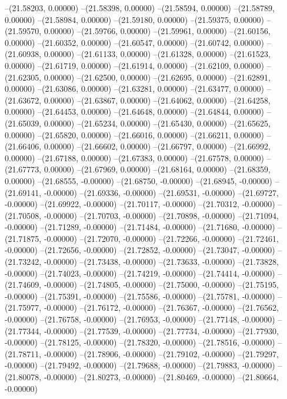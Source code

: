 --(21.58203, 0.00000)
--(21.58398, 0.00000)
--(21.58594, 0.00000)
--(21.58789, 0.00000)
--(21.58984, 0.00000)
--(21.59180, 0.00000)
--(21.59375, 0.00000)
--(21.59570, 0.00000)
--(21.59766, 0.00000)
--(21.59961, 0.00000)
--(21.60156, 0.00000)
--(21.60352, 0.00000)
--(21.60547, 0.00000)
--(21.60742, 0.00000)
--(21.60938, 0.00000)
--(21.61133, 0.00000)
--(21.61328, 0.00000)
--(21.61523, 0.00000)
--(21.61719, 0.00000)
--(21.61914, 0.00000)
--(21.62109, 0.00000)
--(21.62305, 0.00000)
--(21.62500, 0.00000)
--(21.62695, 0.00000)
--(21.62891, 0.00000)
--(21.63086, 0.00000)
--(21.63281, 0.00000)
--(21.63477, 0.00000)
--(21.63672, 0.00000)
--(21.63867, 0.00000)
--(21.64062, 0.00000)
--(21.64258, 0.00000)
--(21.64453, 0.00000)
--(21.64648, 0.00000)
--(21.64844, 0.00000)
--(21.65039, 0.00000)
--(21.65234, 0.00000)
--(21.65430, 0.00000)
--(21.65625, 0.00000)
--(21.65820, 0.00000)
--(21.66016, 0.00000)
--(21.66211, 0.00000)
--(21.66406, 0.00000)
--(21.66602, 0.00000)
--(21.66797, 0.00000)
--(21.66992, 0.00000)
--(21.67188, 0.00000)
--(21.67383, 0.00000)
--(21.67578, 0.00000)
--(21.67773, 0.00000)
--(21.67969, 0.00000)
--(21.68164, 0.00000)
--(21.68359, 0.00000)
--(21.68555, -0.00000)
--(21.68750, -0.00000)
--(21.68945, -0.00000)
--(21.69141, -0.00000)
--(21.69336, -0.00000)
--(21.69531, -0.00000)
--(21.69727, -0.00000)
--(21.69922, -0.00000)
--(21.70117, -0.00000)
--(21.70312, -0.00000)
--(21.70508, -0.00000)
--(21.70703, -0.00000)
--(21.70898, -0.00000)
--(21.71094, -0.00000)
--(21.71289, -0.00000)
--(21.71484, -0.00000)
--(21.71680, -0.00000)
--(21.71875, -0.00000)
--(21.72070, -0.00000)
--(21.72266, -0.00000)
--(21.72461, -0.00000)
--(21.72656, -0.00000)
--(21.72852, -0.00000)
--(21.73047, -0.00000)
--(21.73242, -0.00000)
--(21.73438, -0.00000)
--(21.73633, -0.00000)
--(21.73828, -0.00000)
--(21.74023, -0.00000)
--(21.74219, -0.00000)
--(21.74414, -0.00000)
--(21.74609, -0.00000)
--(21.74805, -0.00000)
--(21.75000, -0.00000)
--(21.75195, -0.00000)
--(21.75391, -0.00000)
--(21.75586, -0.00000)
--(21.75781, -0.00000)
--(21.75977, -0.00000)
--(21.76172, -0.00000)
--(21.76367, -0.00000)
--(21.76562, -0.00000)
--(21.76758, -0.00000)
--(21.76953, -0.00000)
--(21.77148, -0.00000)
--(21.77344, -0.00000)
--(21.77539, -0.00000)
--(21.77734, -0.00000)
--(21.77930, -0.00000)
--(21.78125, -0.00000)
--(21.78320, -0.00000)
--(21.78516, -0.00000)
--(21.78711, -0.00000)
--(21.78906, -0.00000)
--(21.79102, -0.00000)
--(21.79297, -0.00000)
--(21.79492, -0.00000)
--(21.79688, -0.00000)
--(21.79883, -0.00000)
--(21.80078, -0.00000)
--(21.80273, -0.00000)
--(21.80469, -0.00000)
--(21.80664, -0.00000)
